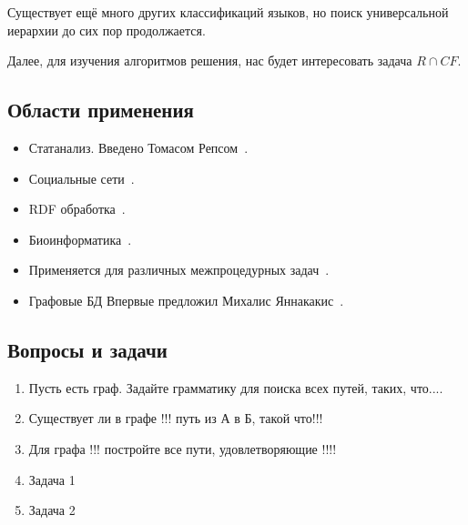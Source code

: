 Существует ещё много других классификаций языков, но поиск универсальной иерархии до сих пор продолжается.

Далее, для изучения алгоритмов решения, нас будет интересовать задача $R \cap CF$.

\subsection{Области применения}
\begin{itemize}
	\item Статанализ. 
	Введено Томасом Репсом~\cite{Reps}.
	\item Социальные сети~\cite{Hellings2015PathRF}.
	\item RDF обработка~\cite{10.1007/978-3-319-46523-4_38}.
	\item Биоинформатика~\cite{cfpqBio}.
	\item Применяется для различных межпроцедурных задач~\cite{LabelFlowCFLReachability,specificationCFLReachability,Zheng}.
	\item Графовые БД
	Впервые предложил Михалис Яннакакис~\cite{Yannakakis}.
	
\end{itemize}

\subsection{Вопросы и задачи}
\begin{enumerate}
	\item Пусть есть граф. Задайте грамматику для поиска всех путей, таких, что....
	\item Существует ли в графе !!! путь из А в Б, такой что!!!
	\item Для графа !!! постройте все пути, удовлетворяющие !!!!
	
	\item Задача 1
	\item Задача 2
\end{enumerate}

